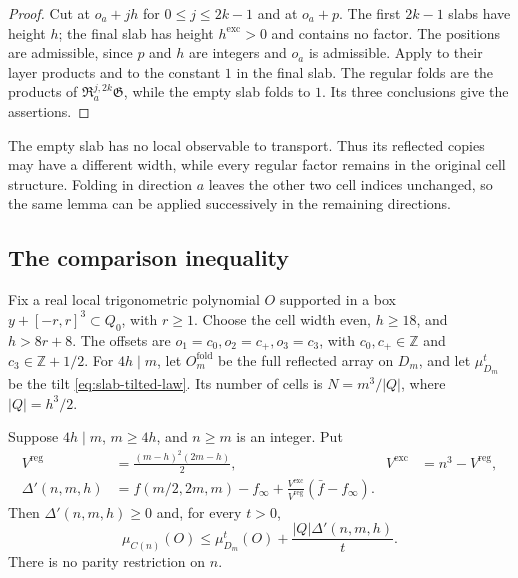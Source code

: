 \documentclass[11pt,letterpaper,reqno]{amsart}
\newcommand{\Z}{\mathbb Z}
\begin{document}
\begin{proof}
Cut at $o_a+jh$ for $0\le j\le2k-1$ and at $o_a+p$.
The first $2k-1$ slabs have height $h$; the final slab has height
$h^{\mathrm{exc}}>0$ and contains no factor. The positions are
admissible, since $p$ and $h$ are integers and $o_a$ is admissible.
Apply  to their layer products
and to the constant $1$ in the final slab. The regular folds are
the products of $\mathfrak R_a^{j,2k}\mathfrak G$, while the empty
slab folds to $1$. Its three conclusions give the assertions.
\end{proof}

The empty slab has no local observable to transport. Thus its reflected
copies may have a different width, while every regular factor remains
in the original cell structure. Folding in direction $a$ leaves the
other two cell indices unchanged, so the same lemma can be applied
successively in the remaining directions.

\subsection{The comparison inequality}

Fix a real local trigonometric polynomial $O$ supported in a box
$y+[-r,r]^3\subset Q_0$, with $r\ge1$. Choose the cell width even,
$h\ge18$, and $h>8r+8$. The offsets are
$o_1=c_0,o_2=c_+,o_3=c_3$, with $c_0,c_+\in\Z$ and
$c_3\in\Z+1/2$. For $4h\mid m$, let $O_m^{\mathrm{fold}}$ be
the full reflected array on $D_m$, and let $\mu_{D_m}^t$ be the
tilt \eqref{eq:slab-tilted-law}. Its number of cells is
$N=m^3/|Q|$, where $|Q|=h^3/2$.

\begin{proposition}\label{prop:fold-any-side}
Suppose $4h\mid m$, $m\ge4h$, and $n\ge m$ is an integer.
Put
\begin{align*}
 V^{\mathrm{reg}}&=\frac{(m-h)^2(2m-h)}2,
 &V^{\mathrm{exc}}&=n^3-V^{\mathrm{reg}},\\
 \Delta'(n,m,h)&=f(m/2,2m,m)-f_\infty
       +\frac{V^{\mathrm{exc}}}{V^{\mathrm{reg}}}
                     (\bar f-f_\infty).
\end{align*}
Then $\Delta'(n,m,h)\ge0$ and, for every $t>0$,
\begin{equation}\label{eq:sides-expectation-comparison}
 \mu_{C(n)}(O)\le\mu_{D_m}^t(O)
                   +\frac{|Q|\Delta'(n,m,h)}t.
\end{equation}
There is no parity restriction on $n$.
\end{proposition}
\end{document}
